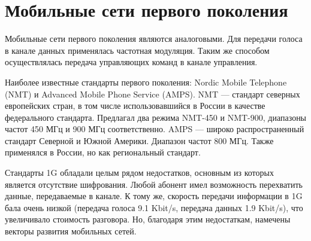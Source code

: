 \section{Мобильные сети первого поколения}
Мобильные сети первого поколения являются аналоговыми. Для передачи голоса в канале данных применялась частотная модуляция. Таким же способом осуществлялась передача управляющих команд в канале управления.

Наиболее известные стандарты первого поколения: Nordic Mobile Telephone (NMT) и Advanced Mobile Phone Service (AMPS).
NMT --- стандарт северных европейских стран, в том числе использовавшийся в России в качестве федерального стандарта. Предлагал два режима NMT-450 и NMT-900, диапазоны частот 450 МГц и 900 МГц соответственно.
AMPS --- широко распространенный стандарт Северной и Южной Америки. Диапазон частот 800 МГц. Также применялся в России, но как региональный стандарт.

Стандарты 1G обладали целым рядом недостатков, основным из которых является отсутствие шифрования. Любой абонент имел возможность перехватить данные, передаваемые в канале. К тому же, скорость передачи информации в 1G бала очень низкой (передача голоса 9.1 Kbit/s, передача данных 1.9 Kbit/s), что увеличивало стоимость разговора. Но, благодаря этим недостаткам, намечены векторы развития мобильных сетей.

